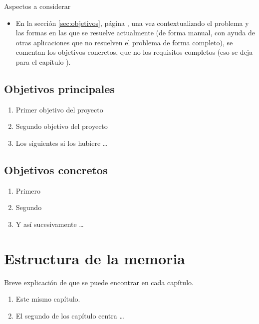 { \color{red} Aspectos a considerar
    \begin{itemize}
      \item En la sección \ref{sec:objetivos}, página \pageref{sec:objetivos}, una vez contextualizado el problema y las formas en las que se resuelve actualmente (de forma manual, con ayuda de otras aplicaciones que no resuelven el problema de forma completo), se comentan los objetivos concretos, que no los requisitos completos (eso se deja para el capítulo \pageref{chap:requisitos} ).
    \end{itemize}
}

\subsection{Objetivos principales}

\begin{enumerate}
    \item Primer objetivo del proyecto
    \item Segundo objetivo del proyecto
    \item Los siguientes si los hubiere \ldots
\end{enumerate}


\subsection{Objetivos concretos}

\begin{enumerate}
    \item Primero
    \item Segundo 
    \item Y así sucesivamente \ldots
\end{enumerate}


\section{Estructura de la memoria}
\label{sec:estructura}
Breve  explicación de que se puede encontrar en cada capítulo.

\begin{enumerate}
    \item Este mismo capítulo.
    \item El segundo de los capítulo centra \ldots
\end{enumerate}

